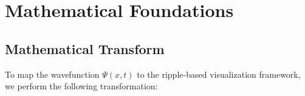 \documentclass[12pt]{article}
\begin{document}

\section{Mathematical Foundations}
\label{sec:mathematical_foundations}


\subsection{Mathematical Transform}
To map the wavefunction \(\Psi(x,t)\) to the ripple-based visualization framework, we perform the following transformation:
\end{document}
